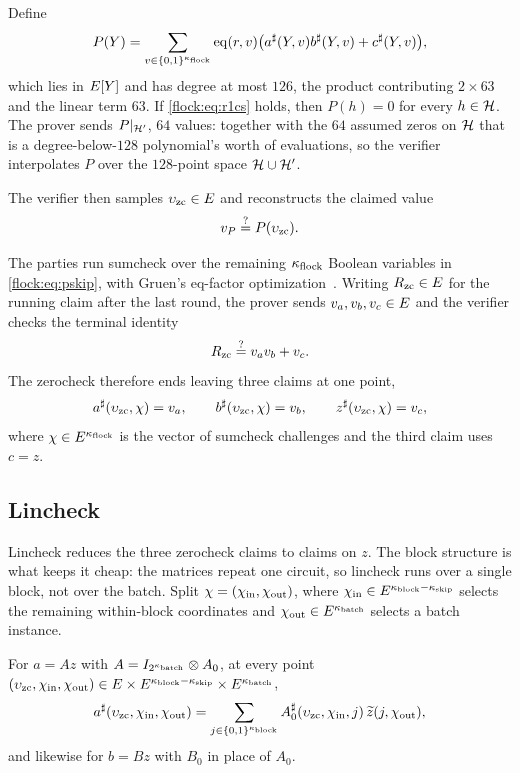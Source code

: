 Define
\begin{equation}\label{flock:eq:pskip}
P(Y)=\sum_{v\in\{0,1\}^{\kappa_{\mathrm{flock}}}}\operatorname{eq}(r,v)\bigl(a^{\sharp}(Y,v)b^{\sharp}(Y,v)+c^{\sharp}(Y,v)\bigr),
\end{equation}
which lies in $E[Y]$ and has degree at most $126$, the product contributing $2\times 63$ and the linear term $63$. If \eqref{flock:eq:r1cs} holds, then $P(h)=0$ for every $h\in\mathcal{H}$. The prover sends $P|_{\mathcal{H}'}$, $64$ values: together with the $64$ assumed zeros on $\mathcal{H}$ that is a degree-below-$128$ polynomial's worth of evaluations, so the verifier interpolates $P$ over the $128$-point space $\mathcal{H}\cup\mathcal{H}'$.

The verifier then samples $\upsilon_{\mathrm{zc}}\in E$ and reconstructs the claimed value
\[
v_P \stackrel{?}{=} P(\upsilon_{\mathrm{zc}}).
\]

The parties run sumcheck over the remaining $\kappa_{\mathrm{flock}}$ Boolean variables in \eqref{flock:eq:pskip}, with Gruen's eq-factor optimization~\cite{Gru24}. Writing $R_{\mathrm{zc}}\in E$ for the running claim after the last round, the prover sends $v_a,v_b,v_c\in E$ and the verifier checks the terminal identity
\begin{equation}\label{flock:eq:zc-terminal}
R_{\mathrm{zc}}\stackrel{?}{=} v_av_b+v_c.
\end{equation}
The zerocheck therefore ends leaving three claims at one point,
\begin{equation}\label{flock:eq:zc-claims}
a^{\sharp}(\upsilon_{\mathrm{zc}},\chi)=v_a,\qquad b^{\sharp}(\upsilon_{\mathrm{zc}},\chi)=v_b,\qquad z^{\sharp}(\upsilon_{\mathrm{zc}},\chi)=v_c,
\end{equation}
where $\chi\in E^{\kappa_{\mathrm{flock}}}$ is the vector of sumcheck challenges and the third claim uses $c=z$.

\subsection{Lincheck}\label{flock:lincheck}

Lincheck reduces the three zerocheck claims to claims on $z$. The block structure is what keeps it cheap: the matrices repeat one circuit, so lincheck runs over a single block, not over the batch. Split $\chi=(\chi_{\mathrm{in}},\chi_{\mathrm{out}})$, where $\chi_{\mathrm{in}}\in E^{\kappa_{\mathrm{block}}-\kappa_{\mathrm{skip}}}$ selects the remaining within-block coordinates and $\chi_{\mathrm{out}}\in E^{\kappa_{\mathrm{batch}}}$ selects a batch instance.

\begin{lemma}\label{lem:flock-block-diagonal}
For $a=Az$ with $A=I_{2^{\kappa_{\mathrm{batch}}}}\otimes A_0$, at every point $(\upsilon_{\mathrm{zc}},\chi_{\mathrm{in}},\chi_{\mathrm{out}})\in E\times E^{\kappa_{\mathrm{block}}-\kappa_{\mathrm{skip}}}\times E^{\kappa_{\mathrm{batch}}}$,
\[
a^{\sharp}(\upsilon_{\mathrm{zc}},\chi_{\mathrm{in}},\chi_{\mathrm{out}})=\sum_{j\in\{0,1\}^{\kappa_{\mathrm{block}}}}A^{\sharp}_0(\upsilon_{\mathrm{zc}},\chi_{\mathrm{in}},j)\,\widetilde{z}(j,\chi_{\mathrm{out}}),
\]
and likewise for $b=Bz$ with $B_0$ in place of $A_0$.
\end{lemma}

